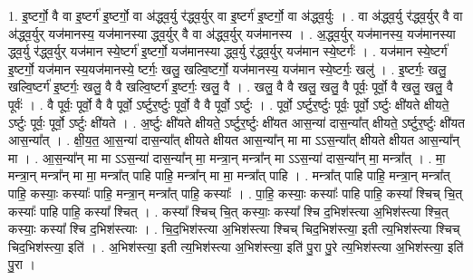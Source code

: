 \documentclass[17pt]{extarticle}
\begin{document}
1. इ॒ष्टर्गो॒ वै वा इ॒ष्टर्ग॑ इ॒ष्टर्गो॒ वा अ॑द्ध्व॒र्यु र॑द्ध्व॒र्युर् वा इ॒ष्टर्ग॑ इ॒ष्टर्गो॒ वा अ॑द्ध्व॒र्युः । . वा अ॑द्ध्व॒र्यु र॑द्ध्व॒र्युर् वै वा अ॑द्ध्व॒र्युर् यज॑मानस्य॒ यज॑मानस्या द्ध्व॒र्युर् वै वा अ॑द्ध्व॒र्युर् यज॑मानस्य । . अ॒द्ध्व॒र्युर् यज॑मानस्य॒ यज॑मानस्या द्ध्व॒र्यु र॑द्ध्व॒र्युर् यज॑मान स्ये॒ष्टर्ग॑ इ॒ष्टर्गो॒ यज॑मानस्या द्ध्व॒र्यु र॑द्ध्व॒र्युर् यज॑मान स्ये॒ष्टर्गः॑ । . यज॑मान स्ये॒ष्टर्ग॑ इ॒ष्टर्गो॒ यज॑मान स्य॒यज॑मानस्ये॒ ष्टर्गः॒ खलु॒ खल्वि॒ष्टर्गो॒ यज॑मानस्य॒ 
यज॑मान स्ये॒ष्टर्गः॒ खलु॑ । . इ॒ष्टर्गः॒ खलु॒ खल्वि॒ष्टर्ग॑ इ॒ष्टर्गः॒ खलु॒ वै वै खल्वि॒ष्टर्ग॑ इ॒ष्टर्गः॒ खलु॒ वै । . खलु॒ वै वै खलु॒ खलु॒ वै पूर्वः॒ पूर्वो॒ वै खलु॒ खलु॒ वै पूर्वः॑ । . वै पूर्वः॒ पूर्वो॒ वै वै पूर्वो॒ ऽर्ष्टुर॒र्ष्टुः पूर्वो॒ वै वै पूर्वो॒ ऽर्ष्टुः । . पूर्वो॒ ऽर्ष्टुर॒र्ष्टुः पूर्वः॒ पूर्वो॒ ऽर्ष्टुः क्षी॑यते क्षीयते॒ ऽर्ष्टुः पूर्वः॒ पूर्वो॒ ऽर्ष्टुः क्षी॑यते । . अ॒र्ष्टुः क्षी॑यते क्षीयते॒ ऽर्ष्टुर॒र्ष्टुः क्षी॑यत आस॒न्या॑ दास॒न्या᳚त् क्षीयते॒ ऽर्ष्टुर॒र्ष्टुः क्षी॑यत आस॒न्या᳚त् । . क्षी॒य॒त॒ आ॒स॒न्या॑ दास॒न्या᳚त् क्षीयते क्षीयत आस॒न्या᳚न् मा मा ऽऽस॒न्या᳚त् क्षीयते क्षीयत आस॒न्या᳚न् मा । . आ॒स॒न्या᳚न् मा मा ऽऽस॒न्या॑ दास॒न्या᳚न् मा॒ मन्त्रा॒न् मन्त्रा᳚न् मा ऽऽस॒न्या॑ दास॒न्या᳚न् मा॒ मन्त्रा᳚त् । . मा॒ मन्त्रा॒न् मन्त्रा᳚न् मा मा॒ मन्त्रा᳚त् पाहि पाहि॒ मन्त्रा᳚न् मा मा॒ मन्त्रा᳚त् पाहि । . मन्त्रा᳚त् पाहि पाहि॒ मन्त्रा॒न् मन्त्रा᳚त् पाहि॒ कस्याः॒ कस्याः᳚ पाहि॒ मन्त्रा॒न् मन्त्रा᳚त् पाहि॒ कस्याः᳚ । . पा॒हि॒ कस्याः॒ कस्याः᳚ पाहि पाहि॒ कस्या᳚ श्चिच् चि॒त् कस्याः᳚ पाहि पाहि॒ कस्या᳚ श्चित् । . कस्या᳚ श्चिच् चि॒त् कस्याः॒ कस्या᳚ श्चि द॒भिश॑स्त्या अ॒भिश॑स्त्या श्चि॒त् कस्याः॒ कस्या᳚ श्चि द॒भिश॑स्त्याः । . चि॒द॒भिश॑स्त्या अ॒भिश॑स्त्या श्चिच् चिद॒भिश॑स्त्या॒ इती त्य॒भिश॑स्त्या श्चिच् चिद॒भिश॑स्त्या॒ इति॑ । . अ॒भिश॑स्त्या॒ इती त्य॒भिश॑स्त्या अ॒भिश॑स्त्या॒ इति॑ पु॒रा पु॒रे त्य॒भिश॑स्त्या अ॒भिश॑स्त्या॒ इति॑ पु॒रा । \newline
\end{document}
